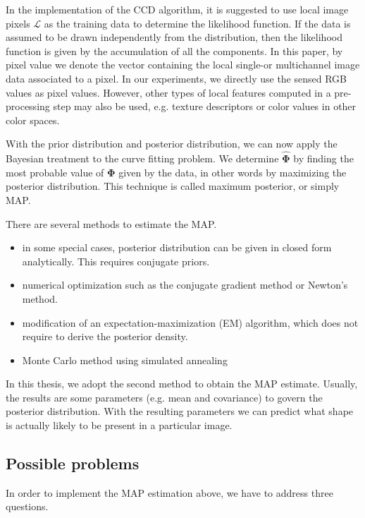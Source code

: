 In the implementation of the CCD algorithm, it is suggested to use local image pixels $\mathcal{L}$ as the training data to
determine the likelihood function. If the data is assumed to be drawn
 independently from the distribution, then the likelihood function is
given by the accumulation of all the components.
In this paper, by pixel value we denote the vector containing the local single-or multichannel
image data associated to a pixel. In our experiments, we directly use the sensed RGB
values as pixel values. However, other types of local features computed in a pre-processing
step may also be used, e.g. texture descriptors or color values in
other color spaces.

With the prior distribution and posterior distribution, we can now
apply the Bayesian treatment to the curve fitting problem.
We determine $\hat{\mathbf{\Phi}}$ by finding the most probable
value of $\mathbf{\Phi}$ given by the data, in other words by maximizing
the posterior distribution. This technique is called maximum
posterior, or simply MAP.

There are several methods to estimate the MAP.
\begin{itemize}
\item in some special cases, posterior distribution can be given in
  closed form analytically. This requires conjugate priors.
\item numerical optimization such as the conjugate gradient method or
  Newton's method.
\item modification of an expectation-maximization (EM) algorithm,
  which does not require to derive the posterior density.
\item Monte Carlo method using simulated annealing
\end{itemize}

In this thesis, we adopt the second method to obtain the MAP estimate.
Usually, the results are some parameters (e.g. mean and covariance) to
govern the posterior distribution. With the resulting parameters we
can predict what shape is actually likely to be present in a particular image.


\subsection{Possible problems}
\label{sec:prob}
In order to implement the MAP estimation above, we have to address
three questions.

